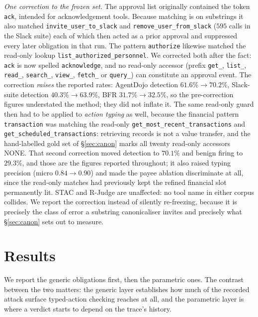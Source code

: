 \documentclass[sigconf]{acmart}
\begin{document}
\emph{One correction to the frozen set.} The approval list originally contained the
token \texttt{ack}, intended for acknowledgement tools. Because matching is on
substrings it also matched \texttt{invite\_user\_to\_slack} and
\texttt{remove\_user\_from\_slack} ($595$ calls in the Slack suite) each of which
then acted as a prior approval and suppressed every later obligation in that run. The
pattern \texttt{authorize} likewise matched the read-only lookup
\texttt{list\_authorized\_personnel}. We corrected both after the fact: \texttt{ack} is
now spelled \texttt{acknowledge}, and no read-only accessor (prefix \texttt{get\_},
\texttt{list\_}, \texttt{read\_}, \texttt{search\_}, \texttt{view\_}, \texttt{fetch\_} or
\texttt{query\_}) can constitute an approval event. The correction \emph{raises} the
reported rates: AgentDojo detection $61.6\%\!\to\!70.2\%$, Slack-suite detection
$40.3\%\!\to\!63.9\%$, BFR $31.7\%\!\to\!32.5\%$, so the pre-correction figures
understated the method; they did not inflate it. The same read-only guard then had to
be applied to \emph{action typing} as well, because the financial pattern
\texttt{transaction} was matching the read-only \texttt{get\_most\_recent\_transactions}
and \texttt{get\_scheduled\_transactions}: retrieving records is not a value transfer,
and the hand-labelled gold set of \S\ref{sec:canon} marks all twenty read-only accessors
\textsf{NONE}. That second correction moved detection to $70.1\%$ and benign firing to
$29.3\%$, and those are the figures reported throughout; it also raised typing precision
(micro $0.84\!\to\!0.90$) and made the payee ablation discriminate at all, since the
read-only matches had previously kept the refined financial slot permanently lit. STAC
and R-Judge are unaffected: no tool name in either corpus collides. We report the correction instead of silently re-freezing, because it is
precisely the class of error a substring canonicaliser invites and precisely what
\S\ref{sec:canon} sets out to measure.

\section{Results}
\label{sec:results}

We report the generic obligations first, then the parametric ones. The contrast between
the two matters: the generic layer establishes how much of the recorded attack
surface typed-action checking reaches at all, and the parametric layer is where a verdict
starts to depend on the trace's history.
\end{document}
